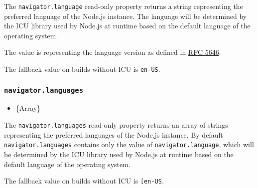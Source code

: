 The \texttt{navigator.language} read-only property returns a string
representing the preferred language of the Node.js instance. The
language will be determined by the ICU library used by Node.js at
runtime based on the default language of the operating system.

The value is representing the language version as defined in
\href{https://www.rfc-editor.org/rfc/rfc5646.txt}{RFC 5646}.

The fallback value on builds without ICU is
\texttt{\textquotesingle{}en-US\textquotesingle{}}.

\begin{Shaded}
\begin{Highlighting}[]
\NormalTok{(}\SpecialCharTok{$\{}\SpecialCharTok{\}}\VerbatimStringTok{\textquotesingle{}\textasciigrave{}}\NormalTok{)}\OperatorTok{;}
\end{Highlighting}
\end{Shaded}

\subsubsection{\texorpdfstring{\texttt{navigator.languages}}{navigator.languages}}\label{navigator.languages}

\begin{itemize}
\tightlist
\item
  \{Array\}
\end{itemize}

The \texttt{navigator.languages} read-only property returns an array of
strings representing the preferred languages of the Node.js instance. By
default \texttt{navigator.languages} contains only the value of
\texttt{navigator.language}, which will be determined by the ICU library
used by Node.js at runtime based on the default language of the
operating system.

The fallback value on builds without ICU is
\texttt{{[}\textquotesingle{}en-US\textquotesingle{}{]}}.

\begin{Shaded}
\begin{Highlighting}[]
\NormalTok{(}\SpecialCharTok{$\{}\SpecialCharTok{\}}\VerbatimStringTok{\textquotesingle{}\textasciigrave{}}\NormalTok{)}\OperatorTok{;}
\end{Highlighting}
\end{Shaded}

